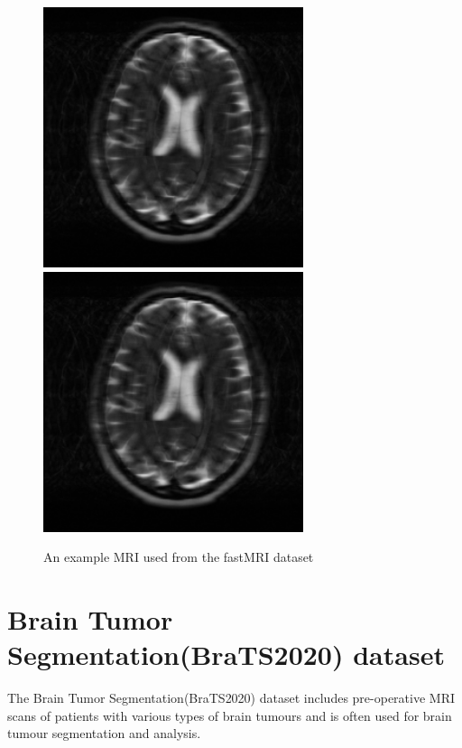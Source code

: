 \begin{figure}[!htbp]
  \begin{center}
    \leavevmode
    \ifpdf
      \includegraphics[height=3in]{Chapter3/Chapter3Figs/challenge_brain_Philips_6751018450_AXT2TSE_3_.png}
    \else
      \includegraphics[bb = 92 86 545 742, height=3in]{Chapter3/Chapter3Figs/challenge_brain_Philips_6751018450_AXT2TSE_3_.png}
    \fi
    \caption{An example MRI used from the fastMRI dataset}
    \label{FigFmri}
  \end{center}
\end{figure}

\section{Brain Tumor Segmentation(BraTS2020) dataset}\label{sec:3_3}

The Brain Tumor Segmentation(BraTS2020) dataset \cite{menze2015multimodal, bakas2017advancing, bakas2018identifying} includes pre-operative MRI scans of patients with various types of brain tumours and is often used for brain tumour segmentation and analysis.\\

